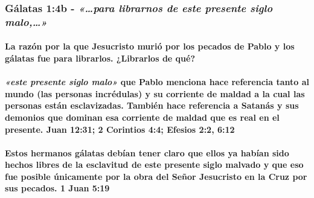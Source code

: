 \documentclass[11a pt,twoside]{article}
\newcommand{\scripture}[1]{%
  {\fontsize{12pt}{16pt}\selectfont\ScriptureFont\itshape #1}%
}
\let\oldsubsubsection\subsubsection
\renewcommand{\subsubsection}{\needspace{4\baselineskip}\oldsubsubsection}
\let\oldparagraph\paragraph
\renewcommand{\paragraph}{\needspace{3\baselineskip}\oldparagraph}
\begin{document}
\subsubsection{\texorpdfstring{Gálatas 1:4b -
\scripture{«…para librarnos de este presente siglo malo,…»}}{Gálatas 1:4b - }}\label{guxe1latas-14b---para-librarnos-de-este-presente-siglo-malo}

\paragraph{La razón por la que Jesucristo murió por los pecados de Pablo
y los gálatas fue para librarlos. ¿Librarlos de
qué?}\label{la-razuxf3n-por-la-que-jesucristo-muriuxf3-por-los-pecados-de-pablo-y-los-guxe1latas-fue-para-librarlos.-librarlos-de-quuxe9}

\paragraph{\texorpdfstring{\scripture{«este presente siglo malo»} que
Pablo menciona hace referencia tanto al mundo (las personas incrédulas)
y su corriente de maldad a la cual las personas están esclavizadas.
También hace referencia a Satanás y sus demonios que dominan esa
corriente de maldad que es real en el presente. Juan 12:31; 2 Corintios
4:4; Efesios 2:2,
6:12}{ que Pablo menciona hace referencia tanto al mundo (las personas incrédulas) y su corriente de maldad a la cual las personas están esclavizadas. También hace referencia a Satanás y sus demonios que dominan esa corriente de maldad que es real en el presente. Juan 12:31; 2 Corintios 4:4; Efesios 2:2, 6:12}}\label{este-presente-siglo-malo-que-pablo-menciona-hace-referencia-tanto-al-mundo-las-personas-incruxe9dulas-y-su-corriente-de-maldad-a-la-cual-las-personas-estuxe1n-esclavizadas.-tambiuxe9n-hace-referencia-a-satanuxe1s-y-sus-demonios-que-dominan-esa-corriente-de-maldad-que-es-real-en-el-presente.-juan-1231-2-corintios-44-efesios-22-612}

\paragraph{Estos hermanos gálatas debían tener claro que ellos ya habían
sido hechos libres de la esclavitud de este presente siglo malvado y que
eso fue posible únicamente por la obra del Señor Jesucristo en la Cruz
por sus pecados. 1 Juan
5:19}\label{estos-hermanos-guxe1latas-debuxedan-tener-claro-que-ellos-ya-habuxedan-sido-hechos-libres-de-la-esclavitud-de-este-presente-siglo-malvado-y-que-eso-fue-posible-uxfanicamente-por-la-obra-del-seuxf1or-jesucristo-en-la-cruz-por-sus-pecados.-1-juan-519}
\end{document}
